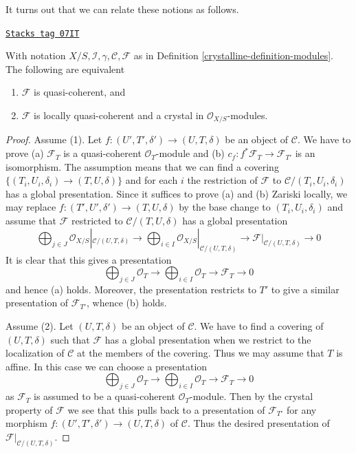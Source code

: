 It turns out that we can relate these notions as follows.

\begin{lemma}
\label{crystalline-lemma-crystal-quasi-coherent-modules}
\href{https://stacks.math.columbia.edu/tag/07IT}{\texttt{Stacks tag 07IT}}

With notation $X/S, \mathcal{I}, \gamma, \mathcal{C}, \mathcal{F}$
as in Definition \ref{crystalline-definition-modules}. The following are equivalent
\begin{enumerate}
\item $\mathcal{F}$ is quasi-coherent, and
\item $\mathcal{F}$ is locally quasi-coherent and a crystal in
$\mathcal{O}_{X/S}$-modules.
\end{enumerate}
\end{lemma}

\begin{proof}
Assume (1). Let $f : (U', T', \delta') \to (U, T, \delta)$ be an object of
$\mathcal{C}$. We have to prove (a) $\mathcal{F}_T$ is a quasi-coherent
$\mathcal{O}_T$-module and (b) $c_f : f^*\mathcal{F}_T \to \mathcal{F}_{T'}$
is an isomorphism. The assumption means that we can find a covering
$\{(T_i, U_i, \delta_i) \to (T, U, \delta)\}$ and for each $i$
the restriction of $\mathcal{F}$ to $\mathcal{C}/(T_i, U_i, \delta_i)$
has a global presentation. Since it suffices to prove (a) and (b)
Zariski locally, we may replace $f : (T', U', \delta') \to (T, U, \delta)$
by the base change to $(T_i, U_i, \delta_i)$ and assume that $\mathcal{F}$
restricted to $\mathcal{C}/(T, U, \delta)$ has a global
presentation
$$
\bigoplus\nolimits_{j \in J}
\mathcal{O}_{X/S}|_{\mathcal{C}/(U, T, \delta)} \longrightarrow
\bigoplus\nolimits_{i \in I}
\mathcal{O}_{X/S}|_{\mathcal{C}/(U, T, \delta)} \longrightarrow
\mathcal{F}|_{\mathcal{C}/(U, T, \delta)}
\longrightarrow 0
$$
It is clear that this gives a presentation
$$
\bigoplus\nolimits_{j \in J} \mathcal{O}_T \longrightarrow
\bigoplus\nolimits_{i \in I} \mathcal{O}_T \longrightarrow
\mathcal{F}_T
\longrightarrow 0
$$
and hence (a) holds. Moreover, the presentation restricts to $T'$
to give a similar presentation of $\mathcal{F}_{T'}$, whence (b) holds.

\medskip\noindent
Assume (2). Let $(U, T, \delta)$ be an object of $\mathcal{C}$.
We have to find a covering of $(U, T, \delta)$ such that $\mathcal{F}$ has a
global presentation when we restrict to the localization of $\mathcal{C}$
at the members of the covering. Thus we may assume that $T$ is affine.
In this case we can choose a presentation
$$
\bigoplus\nolimits_{j \in J} \mathcal{O}_T \longrightarrow
\bigoplus\nolimits_{i \in I} \mathcal{O}_T \longrightarrow
\mathcal{F}_T
\longrightarrow 0
$$
as $\mathcal{F}_T$ is assumed to be a quasi-coherent $\mathcal{O}_T$-module.
Then by the crystal property of $\mathcal{F}$ we see that this pulls back
to a presentation of $\mathcal{F}_{T'}$ for any morphism
$f : (U', T', \delta') \to (U, T, \delta)$ of $\mathcal{C}$.
Thus the desired presentation of $\mathcal{F}|_{\mathcal{C}/(U, T, \delta)}$.
\end{proof}

